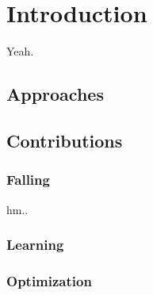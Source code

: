 \chapter{Introduction}
Yeah.

\section{Approaches}

\section{Contributions}

\subsection{Falling}
hm..

\subsection{Learning}

\subsection{Optimization}

